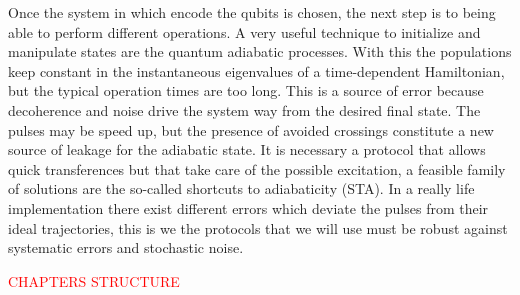 Once the system in which encode the qubits is chosen, the next step is to being able to perform different operations. A very useful technique to initialize and manipulate states are the quantum adiabatic processes. With this the populations keep constant in the instantaneous eigenvalues of a time-dependent Hamiltonian, but the typical operation times are too long. This is a source of error because decoherence and noise drive the system way from the desired final state. The pulses may be speed up, but the presence of avoided crossings constitute a new source of leakage for the adiabatic state. It is necessary a protocol that allows quick transferences but that take care of the possible excitation, a feasible family of solutions are the so-called shortcuts to adiabaticity (STA). In a really life implementation there exist different errors which deviate the pulses from their ideal trajectories, this is we the protocols that we will use must be robust against systematic errors and stochastic noise.\\

\begin{center}
	\textcolor{red}{CHAPTERS STRUCTURE}
\end{center}








